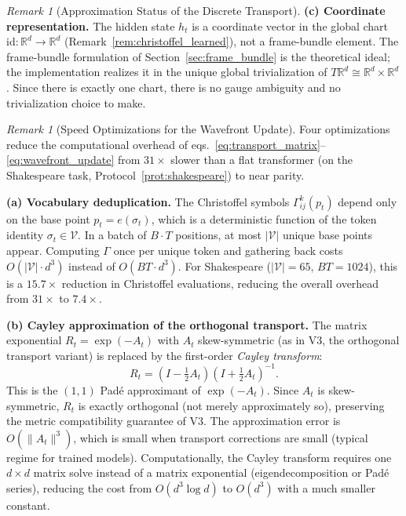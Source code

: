 \documentclass[11pt,a4paper]{article}
\theoremstyle{definition}
\theoremstyle{remark}
\newtheorem{remark}[theorem]{Remark}
\newcommand{\R}{\mathbb{R}}
\begin{document}
\begin{remark}[Approximation Status of the Discrete Transport]
\textbf{(c) Coordinate representation.}  
The hidden state $h_t$ is a coordinate vector in the global chart 
$\mathrm{id} : \R^d \to \R^d$ 
(Remark~\ref{rem:christoffel_learned}), not a frame-bundle 
element. The frame-bundle formulation of 
Section~\ref{sec:frame_bundle} is the theoretical ideal; the 
implementation realizes it in the unique global trivialization 
of $T\R^d \cong \R^d \times \R^d$. Since there is exactly one 
chart, there is no gauge ambiguity and no trivialization choice 
to make.
\end{remark}

\begin{remark}[Speed Optimizations for the Wavefront Update]%
\label{rem:speed_opt}
Four optimizations reduce the computational overhead of
eqs.~\eqref{eq:transport_matrix}--\eqref{eq:wavefront_update}
from $31\times$ slower than a flat transformer (on the
Shakespeare task, Protocol~\ref{prot:shakespeare}) to near
parity.

\textbf{(a) Vocabulary deduplication.}
The Christoffel symbols $\Gamma^k_{ij}(p_t)$ depend only on
the base point $p_t = e(\sigma_t)$, which is a deterministic
function of the token identity $\sigma_t \in \mathcal{V}$.
In a batch of $B \cdot T$ positions, at most $|\mathcal{V}|$
unique base points appear.  Computing $\Gamma$ once per unique
token and gathering back costs
$O(|\mathcal{V}| \cdot d^3)$ instead of $O(B T \cdot d^3)$.
For Shakespeare ($|\mathcal{V}| = 65$, $BT = 1024$), this is
a $15.7\times$ reduction in Christoffel evaluations,
reducing the overall overhead from $31\times$ to $7.4\times$.

\textbf{(b) Cayley approximation of the orthogonal transport.}
The matrix exponential $R_t = \exp(-A_t)$ with $A_t$
skew-symmetric (as in V3, the orthogonal transport variant)
is replaced by the first-order \emph{Cayley transform}:
\begin{equation}\label{eq:cayley}
  R_t = (I - \tfrac{1}{2} A_t)(I + \tfrac{1}{2} A_t)^{-1}.
\end{equation}
This is the $(1,1)$ Pad\'e approximant of $\exp(-A_t)$.
Since $A_t$ is skew-symmetric, $R_t$ is exactly orthogonal
(not merely approximately so), preserving the metric
compatibility guarantee of V3.  The approximation error is
$O(\|A_t\|^3)$, which is small when transport corrections
are small (typical regime for trained models).
Computationally, the Cayley transform requires one
$d \times d$ matrix solve instead of a matrix exponential
(eigendecomposition or Pad\'e series), reducing the cost
from $O(d^3 \log d)$ to $O(d^3)$ with a much smaller
constant.


\end{remark}
\end{document}
